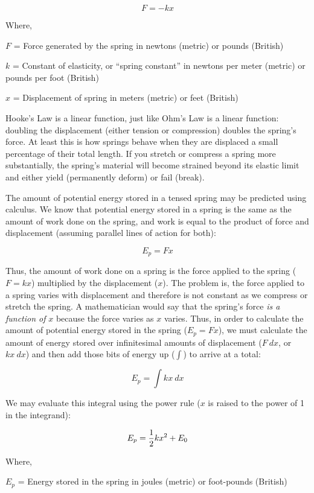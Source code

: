 $$F = -kx$$

\noindent
Where,

$F$ = Force generated by the spring in newtons (metric) or pounds (British)

$k$ = Constant of elasticity, or ``spring constant'' in newtons per meter (metric) or pounds per foot (British)

$x$ = Displacement of spring in meters (metric) or feet (British)

\vskip 10pt

Hooke's Law is a linear function, just like Ohm's Law is a linear function: doubling the displacement (either tension or compression) doubles the spring's force.  At least this is how springs behave when they are displaced a small percentage of their total length.  If you stretch or compress a spring more substantially, the spring's material will become strained beyond its elastic limit and either yield (permanently deform) or fail (break).

The amount of potential energy stored in a tensed spring may be predicted using calculus.  We know that potential energy stored in a spring is the same as the amount of work done on the spring, and work is equal to the product of force and displacement (assuming parallel lines of action for both):

$$E_p = Fx$$

Thus, the amount of work done on a spring is the force applied to the spring ($F = kx$) multiplied by the displacement ($x$).  The problem is, the force applied to a spring varies with displacement and therefore is not constant as we compress or stretch the spring.  A mathematician would say that the spring's force \textit{is a function of} $x$ because the force varies as $x$ varies.  Thus, in order to calculate the amount of potential energy stored in the spring ($E_p = Fx$), we must calculate the amount of energy stored over infinitesimal amounts of displacement ($F \> dx$, or $kx \> dx$) and then add those bits of energy up ($\int$) to arrive at a total:

$$E_p = \int kx \> dx$$

\filbreak

We may evaluate this integral using the power rule ($x$ is raised to the power of 1 in the integrand):

$$E_p = {1 \over 2} k x^2 + E_0$$

\noindent
Where,

$E_p$ = Energy stored in the spring in joules (metric) or foot-pounds (British)

